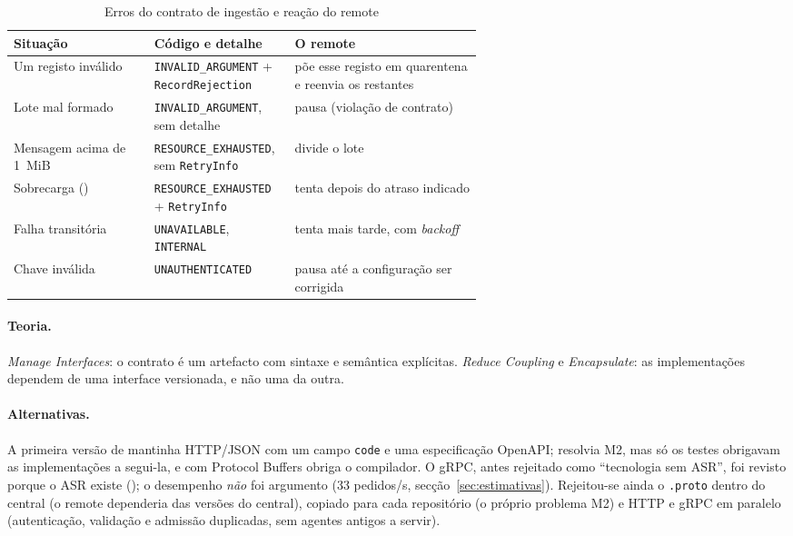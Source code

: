 \begin{table}[htbp]
  \centering\small
  \caption{Erros do contrato de ingestão e reação do remote}
  \label{tab:erros-grpc}
  \begin{tabularx}{\linewidth}{L{0.3\linewidth}L{0.3\linewidth}Y}
    \toprule
    Situação & Código e detalhe & O remote \\
    \midrule
    Um registo inválido & \texttt{INVALID\_ARGUMENT} + \texttt{RecordRejection} & põe esse registo em quarentena e reenvia os restantes \\
    Lote mal formado & \texttt{INVALID\_ARGUMENT}, sem detalhe & pausa (violação de contrato) \\
    Mensagem acima de 1~MiB & \texttt{RESOURCE\_EXHAUSTED}, sem \texttt{RetryInfo} & divide o lote \\
    Sobrecarga () & \texttt{RESOURCE\_EXHAUSTED} + \texttt{RetryInfo} & tenta depois do atraso indicado \\
    Falha transitória & \texttt{UNAVAILABLE}, \texttt{INTERNAL} & tenta mais tarde, com \emph{backoff} \\
    Chave inválida & \texttt{UNAUTHENTICATED} & pausa até a configuração ser corrigida \\
    \bottomrule
  \end{tabularx}
\end{table}

\paragraph{Teoria.}
\emph{Manage Interfaces}: o contrato é um artefacto com sintaxe e semântica explícitas. \emph{Reduce Coupling} e
\emph{Encapsulate}: as implementações dependem de uma interface versionada, e não uma da outra.

\paragraph{Alternativas.}
A primeira versão de  mantinha HTTP/JSON com um campo \texttt{code} e uma especificação OpenAPI; resolvia
M2, mas só os testes obrigavam as implementações a segui-la, e com Protocol Buffers obriga o compilador. O gRPC,
antes rejeitado como ``tecnologia sem ASR'', foi revisto porque o ASR existe (); o desempenho \emph{não}
foi argumento (33 pedidos/s, secção~\ref{sec:estimativas}). Rejeitou-se ainda o \texttt{.proto} dentro do central
(o remote dependeria das versões do central), copiado para cada repositório (o próprio problema M2) e HTTP e gRPC em
paralelo (autenticação, validação e admissão duplicadas, sem agentes antigos a servir).


